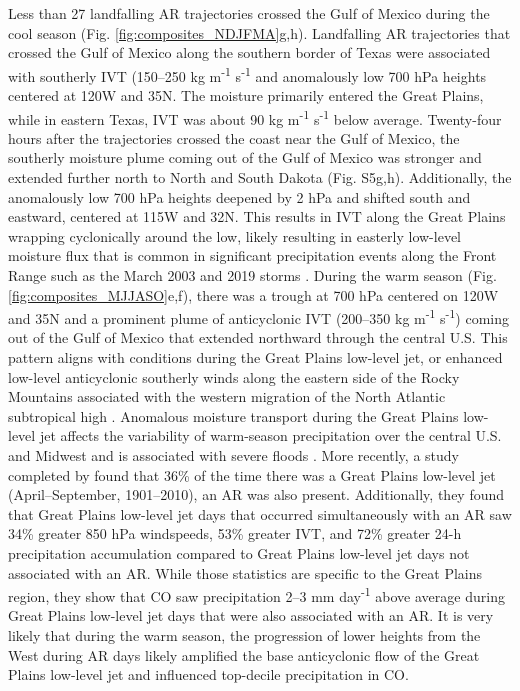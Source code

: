 \documentclass[draft]{agujournal2019}
\begin{document}
Less than 27 landfalling AR trajectories crossed the Gulf of Mexico during the cool season (Fig. \ref{fig:composites_NDJFMA}g,h). Landfalling AR trajectories that crossed the Gulf of Mexico along the southern border of Texas were associated with southerly IVT (150--250 kg m\textsuperscript{-1} s\textsuperscript{-1} and anomalously low 700 hPa heights centered at 120\textdegree W and 35\textdegree N. The moisture primarily entered the Great Plains, while in eastern Texas, IVT was about 90 kg m\textsuperscript{-1} s\textsuperscript{-1} below average. Twenty-four hours after the trajectories crossed the coast near the Gulf of Mexico, the southerly moisture plume coming out of the Gulf of Mexico was stronger and extended further north to North and South Dakota (Fig. S5g,h). Additionally, the anomalously low 700 hPa heights deepened by 2 hPa and shifted south and eastward, centered at 115\textdegree W and 32\textdegree N. This results in IVT along the Great Plains wrapping cyclonically around the low, likely resulting in easterly low-level moisture flux that is common in significant precipitation events along the Front Range such as the March 2003 and 2019 storms \cite{Wesley2013Extreme2003, Zou2025A2019}. During the warm season (Fig. \ref{fig:composites_MJJASO}e,f), there was a trough at 700 hPa centered on 120\textdegree W and 35\textdegree N and a prominent plume of anticyclonic IVT (200--350 kg m\textsuperscript{-1} s\textsuperscript{-1}) coming out of the Gulf of Mexico that extended northward through the central U.S. This pattern aligns with conditions during the Great Plains low-level jet, or enhanced low-level anticyclonic southerly winds along the eastern side of the Rocky Mountains associated with the western migration of the North Atlantic subtropical high \cite{Zhou2021FutureHigh}. Anomalous moisture transport during the Great Plains low-level jet affects the variability of warm-season precipitation over the central U.S. and Midwest \cite{Pu2016DynamicalPrecipitation, Helfand1995ClimatologyStates, Weaver2008VariabilityImpacts, Schubert1998SubseasonalStates} and is associated with severe floods \cite{Mo1997AtmosphericStates, Weaver2009PentadBalance}. More recently, a study completed by  found that 36\% of the time there was a Great Plains low-level jet (April--September, 1901--2010), an AR was also present. Additionally, they found that Great Plains low-level jet days that occurred simultaneously with an AR saw 34\% greater 850 hPa windspeeds, 53\% greater IVT, and 72\% greater 24-h precipitation accumulation compared to Great Plains low-level jet days not associated with an AR. While those statistics are specific to the Great Plains region, they show that CO saw precipitation 2--3 mm day\textsuperscript{-1} above average during Great Plains low-level jet days that were also associated with an AR. It is very likely that during the warm season, the progression of lower heights from the West during AR days likely amplified the base anticyclonic flow of the Great Plains low-level jet and influenced top-decile precipitation in CO. 
\end{document}
